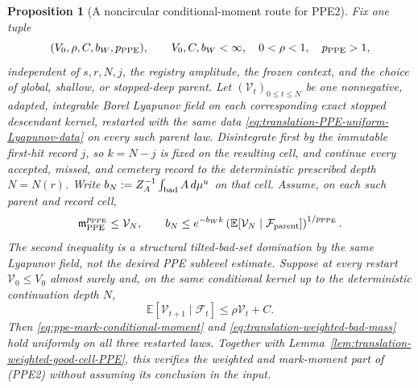 \documentclass[11pt]{article}
\newtheorem{proposition}[theorem]{Proposition}
\begin{document}
\begin{proposition}[A noncircular conditional-moment route for PPE2]
\label{prop:translation-PPE-Lyapunov-route}
Fix one tuple
\begin{equation}
\label{eq:translation-PPE-uniform-Lyapunov-data}
 (V_0,\rho,C,b_W,p_{\rm PPE}),
 \qquad V_0,C,b_W<\infty,\quad 0<\rho<1,
 \quad p_{\rm PPE}>1,
\end{equation}
independent of $s,r,N,j$, the registry amplitude, the frozen context, and
the choice of global, shallow, or stopped-deep parent.  Let
$(\mathcal V_t)_{0\le t\le N}$ be one nonnegative, adapted, integrable Borel
Lyapunov field on each corresponding exact stopped descendant kernel,
restarted with the same data \eqref{eq:translation-PPE-uniform-Lyapunov-data}
on every such parent law.
Disintegrate first by the immutable first-hit record $j$, so $k=N-j$ is
fixed on the resulting cell, and continue every accepted, missed, and
cemetery record to the deterministic prescribed depth $N=N(r)$.  Write
$b_N:=Z_A^{-1}\int_{\rm bad}A\,d\mu^u$ on that cell.  Assume, on each such
parent and record cell,
\begin{equation}
\label{eq:translation-PPE-Lyapunov-domination}
 \mathfrak m_{\rm PPE}^{p_{\rm PPE}}\le\mathcal V_N,
 \qquad
 b_N\le e^{-b_Wk}
 \left(\mathbb E[\mathcal V_N\mid\mathcal F_{\rm parent}]
 \right)^{1/p_{\rm PPE}}.
\end{equation}
The second inequality is a structural tilted-bad-set domination by the same
Lyapunov field, not the desired PPE sublevel estimate.  Suppose at every
restart $\mathcal V_0\le V_0$ almost surely and, on the same conditional
kernel up to the deterministic continuation depth $N$,
\begin{equation}
\label{eq:translation-PPE-Lyapunov-drift}
 \mathbb E[\mathcal V_{t+1}\mid\mathcal F_t]
 \le\rho\mathcal V_t+C.
\end{equation}
Then \eqref{eq:ppe-mark-conditional-moment} and
\eqref{eq:translation-weighted-bad-mass} hold uniformly on all three
restarted laws.  Together with
Lemma~\ref{lem:translation-weighted-good-cell-PPE}, this verifies the
weighted and mark-moment part of \textup{(PPE2)} without assuming its
conclusion in the input.
\end{proposition}
\end{document}
